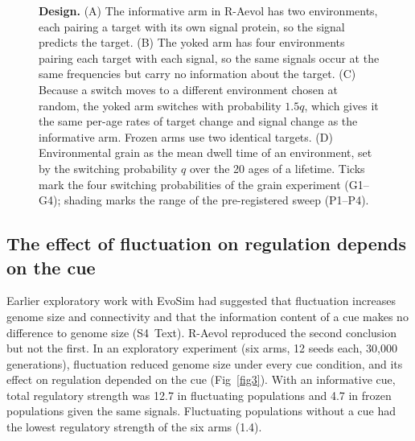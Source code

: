 \documentclass[10pt,letterpaper]{article}
\begin{document}
\begin{figure}[!ht]
\fi
\caption{{\bf Design.}
(A) The informative arm in R-Aevol has two environments, each pairing a target with its own signal protein, so the signal predicts the target.
(B) The yoked arm has four environments pairing each target with each signal, so the
same signals occur at the same frequencies but carry no information about the
target.
(C) Because a switch moves to a different environment chosen at random, the
yoked arm switches with probability $1.5q$, which gives it the same per-age rates of target change and signal change as the informative arm. Frozen arms
use two identical targets.
(D) Environmental grain as the mean dwell time of an environment, set by the
switching probability $q$ over the 20 ages of a lifetime. Ticks mark the four
switching probabilities of the grain experiment (G1--G4); shading marks the
range of the pre-registered sweep (P1--P4).}
\label{fig1}
\end{figure}

\subsection*{The effect of fluctuation on regulation depends on the cue}

Earlier exploratory work with EvoSim had suggested that fluctuation increases
genome size and connectivity and that the information content of a cue makes no
difference to genome size (S4~Text). R-Aevol reproduced the second conclusion but
not the first. In an exploratory experiment (six arms,
12 seeds each, 30{,}000 generations), fluctuation reduced genome size under every
cue condition, and its effect on regulation depended on the cue
(Fig~\ref{fig3}). With an informative
cue, total regulatory strength was 12.7 in fluctuating populations and 4.7 in
frozen populations given the same signals. Fluctuating populations without a cue
had the lowest regulatory strength of the six arms (1.4).
\end{document}
